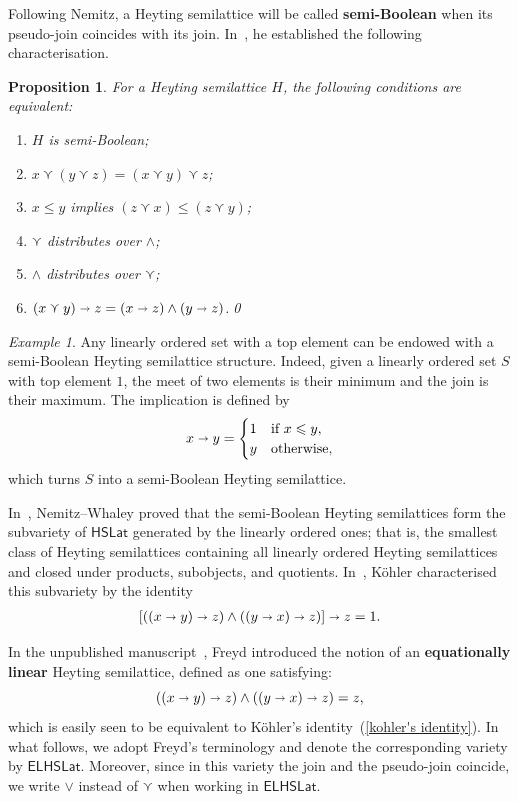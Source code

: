 \documentclass[reqno,a4paper]{amsart}
\newtheorem{proposition}[lemma]{Proposition}
\theoremstyle{remark}
\newtheorem{example}[lemma]{Example}
\theoremstyle{definition}
\newcommand{\defn}{\textbf}
\newcommand{\psj}{\curlyvee}
\newcommand{\noproof}{\hfill \qed}
\newcommand{\iimplies}{\shortrightarrow}
\newcommand{\HSLat}{\ensuremath{\mathsf{HSLat}}}
\newcommand{\ELHSLat}{\ensuremath{\mathsf{ELHSLat}}}
\renewcommand{\leq}{\leqslant}
\begin{document}
Following Nemitz, a Heyting semilattice will be called \defn{semi-Boolean} when its pseudo-join coincides with its join. In~\cite{MR0245486}, he established the following characterisation.

\begin{proposition}\label{proposition equivalences semi-boolean}
	For a Heyting semilattice \(H\), the following conditions are equivalent:
	\begin{enumerate}
		\item \(H\) is semi-Boolean;
		\item \(x \psj (y \psj z) = (x \psj y) \psj z\);
		\item \(x \leq y\) implies \((z \psj x) \leq (z \psj y)\);
		\item \(\psj\) distributes over \(\wedge\);
		\item \(\wedge\) distributes over \(\psj\);
		\item \((x \psj y) \iimplies z = (x \iimplies z) \wedge (y \iimplies z)\).\noproof
	\end{enumerate}
\end{proposition}

\begin{example}
	Any linearly ordered set with a top element can be endowed with a semi-Boolean Heyting semilattice structure. Indeed, given a linearly ordered set \(S\) with top element \(1\), the meet of two elements is their minimum and the join is their maximum. The implication is defined by
	\[
		x \iimplies y =
		\begin{cases}
			1 & \text{if } x \leq y, \\
			y & \text{otherwise},
		\end{cases}
	\]
	which turns \(S\) into a semi-Boolean Heyting semilattice.
\end{example}

In~\cite[Theorem~3.3]{NeWh1}, Nemitz--Whaley proved that the semi-Boolean Heyting semilattices form the subvariety of \(\HSLat\) generated by the linearly ordered ones; that is, the smallest class of Heyting semilattices containing all linearly ordered Heyting semilattices and closed under products, subobjects, and quotients. In~\cite{Kohler}, Köhler characterised this subvariety by the identity
\begin{align}\label{kohler's identity}
	[((x \iimplies y) \iimplies z) \wedge ((y \iimplies x) \iimplies z)] \iimplies z = 1.
\end{align}

In the unpublished manuscript~\cite{FreydHeyting}, Freyd introduced the notion of an \defn{equationally linear} Heyting semilattice, defined as one satisfying:
\[
	((x \iimplies y) \iimplies z) \wedge ((y \iimplies x) \iimplies z) = z,
\]
which is easily seen to be equivalent to Köhler's identity~(\ref{kohler's identity}). In what follows, we adopt Freyd's terminology and denote the corresponding variety by \(\ELHSLat\). Moreover, since in this variety the join and the pseudo-join coincide, we write \(\vee\) instead of \(\psj\) when working in \(\ELHSLat\).
\end{document}
